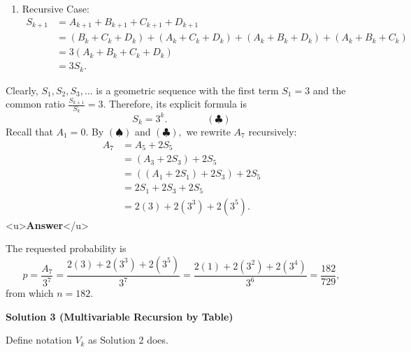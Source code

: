 \begin{enumerate}
\begin{enumerate}
        \item Recursive Case:
 \begin{align*} S_{k+1}&=A_{k+1}+B_{k+1}+C_{k+1}+D_{k+1} \\ &=(B_k+C_k+D_k)+(A_k+C_k+D_k)+(A_k+B_k+D_k)+(A_k+B_k+C_k) \\ &=3(A_k+B_k+C_k+D_k) \\ &=3S_k. \end{align*}

            \end{enumerate}
            Clearly, $S_1,S_2,S_3,\ldots$ is a geometric sequence with the first term $S_1=3$ and the common ratio $\frac{S_{k+1}}{S_k}=3.$ Therefore, its explicit formula is 
 \[S_k=3^k. \qquad\qquad (\clubsuit)\]Recall that $A_1=0.$ By $(\spadesuit)$ and $(\clubsuit),$ we rewrite $A_7$ recursively:
 \begin{align*} A_7 &= A_5+2S_5 \\ &=\left(A_3+2S_3\right)+2S_5 \\ &=\left(\left(A_1+2S_1\right)+2S_3\right)+2S_5 \\ &=2S_1+2S_3+2S_5 \\ &=2(3)+2\left(3^3\right)+2\left(3^5\right). \end{align*}
<u>\textbf{Answer}</u>

 The requested probability is 
 \[p=\frac{A_7}{3^7}=\frac{2(3)+2\left(3^3\right)+2\left(3^5\right)}{3^7}=\frac{2(1)+2\left(3^2\right)+2\left(3^4\right)}{3^6}=\frac{182}{729},\] from which $n=\boxed{182}.$




\textbf{Solution 3 (Multivariable Recursion by Table)}

Define notation $V_k$ as Solution 2 does.


\end{enumerate}
